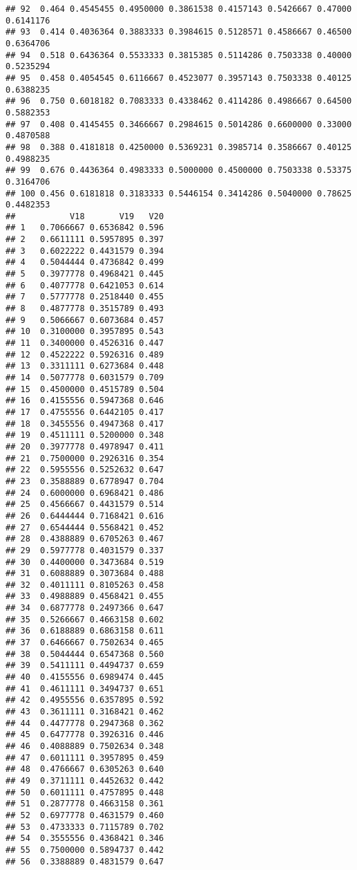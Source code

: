 \documentclass[
]{article}
\begin{document}
\begin{verbatim}
## 92  0.464 0.4545455 0.4950000 0.3861538 0.4157143 0.5426667 0.47000 0.6141176
## 93  0.414 0.4036364 0.3883333 0.3984615 0.5128571 0.4586667 0.46500 0.6364706
## 94  0.518 0.6436364 0.5533333 0.3815385 0.5114286 0.7503338 0.40000 0.5235294
## 95  0.458 0.4054545 0.6116667 0.4523077 0.3957143 0.7503338 0.40125 0.6388235
## 96  0.750 0.6018182 0.7083333 0.4338462 0.4114286 0.4986667 0.64500 0.5882353
## 97  0.408 0.4145455 0.3466667 0.2984615 0.5014286 0.6600000 0.33000 0.4870588
## 98  0.388 0.4181818 0.4250000 0.5369231 0.3985714 0.3586667 0.40125 0.4988235
## 99  0.676 0.4436364 0.4983333 0.5000000 0.4500000 0.7503338 0.53375 0.3164706
## 100 0.456 0.6181818 0.3183333 0.5446154 0.3414286 0.5040000 0.78625 0.4482353
##           V18       V19   V20
## 1   0.7066667 0.6536842 0.596
## 2   0.6611111 0.5957895 0.397
## 3   0.6022222 0.4431579 0.394
## 4   0.5044444 0.4736842 0.499
## 5   0.3977778 0.4968421 0.445
## 6   0.4077778 0.6421053 0.614
## 7   0.5777778 0.2518440 0.455
## 8   0.4877778 0.3515789 0.493
## 9   0.5066667 0.6073684 0.457
## 10  0.3100000 0.3957895 0.543
## 11  0.3400000 0.4526316 0.447
## 12  0.4522222 0.5926316 0.489
## 13  0.3311111 0.6273684 0.448
## 14  0.5077778 0.6031579 0.709
## 15  0.4500000 0.4515789 0.504
## 16  0.4155556 0.5947368 0.646
## 17  0.4755556 0.6442105 0.417
## 18  0.3455556 0.4947368 0.417
## 19  0.4511111 0.5200000 0.348
## 20  0.3977778 0.4978947 0.411
## 21  0.7500000 0.2926316 0.354
## 22  0.5955556 0.5252632 0.647
## 23  0.3588889 0.6778947 0.704
## 24  0.6000000 0.6968421 0.486
## 25  0.4566667 0.4431579 0.514
## 26  0.6444444 0.7168421 0.616
## 27  0.6544444 0.5568421 0.452
## 28  0.4388889 0.6705263 0.467
## 29  0.5977778 0.4031579 0.337
## 30  0.4400000 0.3473684 0.519
## 31  0.6088889 0.3073684 0.488
## 32  0.4011111 0.8105263 0.458
## 33  0.4988889 0.4568421 0.455
## 34  0.6877778 0.2497366 0.647
## 35  0.5266667 0.4663158 0.602
## 36  0.6188889 0.6863158 0.611
## 37  0.6466667 0.7502634 0.465
## 38  0.5044444 0.6547368 0.560
## 39  0.5411111 0.4494737 0.659
## 40  0.4155556 0.6989474 0.445
## 41  0.4611111 0.3494737 0.651
## 42  0.4955556 0.6357895 0.592
## 43  0.3611111 0.3168421 0.462
## 44  0.4477778 0.2947368 0.362
## 45  0.6477778 0.3926316 0.446
## 46  0.4088889 0.7502634 0.348
## 47  0.6011111 0.3957895 0.459
## 48  0.4766667 0.6305263 0.640
## 49  0.3711111 0.4452632 0.442
## 50  0.6011111 0.4757895 0.448
## 51  0.2877778 0.4663158 0.361
## 52  0.6977778 0.4631579 0.460
## 53  0.4733333 0.7115789 0.702
## 54  0.3555556 0.4368421 0.346
## 55  0.7500000 0.5894737 0.442
## 56  0.3388889 0.4831579 0.647

\end{verbatim}
\end{document}
